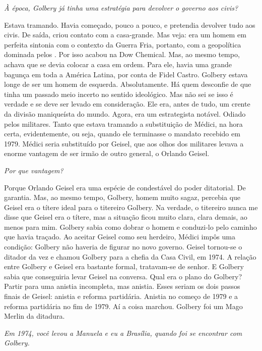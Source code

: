 \itshape
 À época, Golbery já tinha uma estratégia para devolver
o governo aos civis?

\normalfont 
Estava tramando. Havia começado, pouco a pouco, e
pretendia devolver tudo aos civis. De saída, criou contato com a
casa-grande. Mas veja: era um homem em perfeita sintonia com o contexto
da Guerra Fria, portanto, com a geopolítica dominada pelos . Por isso
acabou na Dow Chemical. Mas, ao mesmo tempo, achava que se devia colocar
a casa em ordem. Para ele, havia uma grande bagunça em toda a América
Latina, por conta de Fidel Castro. Golbery estava longe de ser um homem
de esquerda. Absolutamente. Há quem desconfie de que tinha um passado
meio incerto no sentido ideológico. Mas não sei se isso é verdade e se
deve ser levado em consideração. Ele era, antes de tudo, um crente da
divisão maniqueísta do mundo. Agora, era um estrategista notável. Odiado
pelos militares. Tanto que estava tramando a substituição de Médici, na
hora certa, evidentemente, ou seja, quando ele terminasse o mandato
recebido em 1979. Médici seria substituído por Geisel, que aos olhos dos
militares levava a enorme vantagem de ser irmão de outro general, o
Orlando Geisel.

\itshape
 Por que vantagem?

\normalfont 
Porque Orlando Geisel era uma espécie de condestável do
poder ditatorial. De garantia. Mas, ao mesmo tempo, Golbery, homem muito
sagaz, percebia que Geisel era o títere ideal para o titereiro Golbery.
Na verdade, o titereiro nunca me disse que Geisel era o títere, mas a
situação ficou muito clara, clara demais, ao menos para mim. Golbery
sabia como dobrar o homem e conduzi-lo pelo caminho que havia traçado.
Ao aceitar Geisel como seu herdeiro, Médici impôs uma condição: Golbery
não haveria de figurar no novo governo. Geisel tornou-se o ditador da
vez e chamou Golbery para a chefia da Casa Civil, em 1974. A relação
entre Golbery e Geisel era bastante formal, tratavam-se de senhor. E
Golbery sabia que conseguiria levar Geisel na conversa. Qual era o plano
do Golbery? Partir para uma anistia incompleta, mas anistia. Esses
seriam os dois passos finais de Geisel: anistia e reforma partidária.
Anistia no começo de 1979 e a reforma partidária no fim de 1979. Aí a
coisa marchou. Golbery foi um Mago Merlin da ditadura.

\itshape
 Em 1974, você levou a Manuela e eu a Brasília, quando
foi se encontrar com Golbery.

